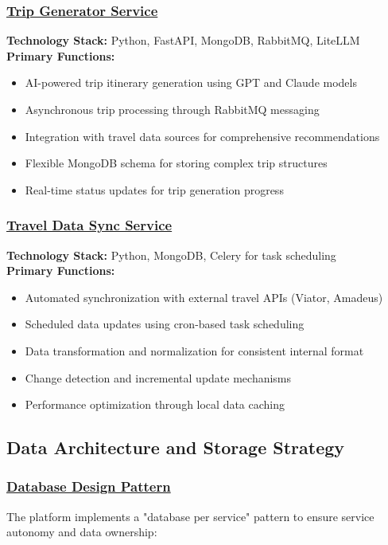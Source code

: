 \subsubsection*{\underline{Trip Generator Service}}
\textbf{Technology Stack:} Python, FastAPI, MongoDB, RabbitMQ, LiteLLM\\
\textbf{Primary Functions:}
\begin{itemize}
    \item AI-powered trip itinerary generation using GPT and Claude models
    \item Asynchronous trip processing through RabbitMQ messaging
    \item Integration with travel data sources for comprehensive recommendations
    \item Flexible MongoDB schema for storing complex trip structures
    \item Real-time status updates for trip generation progress
\end{itemize}

\subsubsection*{\underline{Travel Data Sync Service}}
\textbf{Technology Stack:} Python, MongoDB, Celery for task scheduling\\
\textbf{Primary Functions:}
\begin{itemize}
    \item Automated synchronization with external travel APIs (Viator, Amadeus)
    \item Scheduled data updates using cron-based task scheduling
    \item Data transformation and normalization for consistent internal format
    \item Change detection and incremental update mechanisms
    \item Performance optimization through local data caching
\end{itemize}

\subsection{Data Architecture and Storage Strategy}

\subsubsection*{\underline{Database Design Pattern}}
The platform implements a "database per service" pattern to ensure service autonomy and data ownership:

